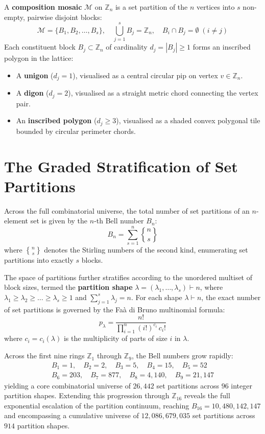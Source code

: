 A \textbf{composition mosaic} $\mathcal{M}$ on $\mathbb{Z}_n$ is a set partition of the $n$ vertices into $s$ non-empty, pairwise disjoint blocks:
\begin{equation}
\mathcal{M} = \{B_1, B_2, \dots, B_s\}, \quad \bigcup_{j=1}^s B_j = \mathbb{Z}_n, \quad B_i \cap B_j = \emptyset \; (i \neq j)
\end{equation}
Each constituent block $B_j \subset \mathbb{Z}_n$ of cardinality $d_j = |B_j| \ge 1$ forms an inscribed polygon in the lattice:
\begin{itemize}
    \item A \textbf{unigon} ($d_j = 1$), visualised as a central circular pip on vertex $v \in \mathbb{Z}_n$.
    \item A \textbf{digon} ($d_j = 2$), visualised as a straight metric chord connecting the vertex pair.
    \item An \textbf{inscribed polygon} ($d_j \ge 3$), visualised as a shaded convex polygonal tile bounded by circular perimeter chords.
\end{itemize}

\section{The Graded Stratification of Set Partitions}

Across the full combinatorial universe, the total number of set partitions of an $n$-element set is given by the $n$-th Bell number $B_n$:
\begin{equation}
B_n = \sum_{s=1}^n \genfrac{\{}{\}}{0pt}{}{n}{s}
\end{equation}
where $\genfrac{\{}{\}}{0pt}{}{n}{s}$ denotes the Stirling numbers of the second kind, enumerating set partitions into exactly $s$ blocks. 

The space of partitions further stratifies according to the unordered multiset of block sizes, termed the \textbf{partition shape} $\lambda = (\lambda_1, \dots, \lambda_s) \vdash n$, where $\lambda_1 \ge \lambda_2 \ge \dots \ge \lambda_s \ge 1$ and $\sum_{j=1}^s \lambda_j = n$. For each shape $\lambda \vdash n$, the exact number of set partitions is governed by the Fa\`a di Bruno multinomial formula:
\begin{equation}
p_\lambda = \frac{n!}{\prod_{i=1}^n (i!)^{c_i} \, c_i!}
\end{equation}
where $c_i = c_i(\lambda)$ is the multiplicity of parts of size $i$ in $\lambda$.

Across the first nine rings $\mathbb{Z}_1$ through $\mathbb{Z}_9$, the Bell numbers grow rapidly:
\begin{gather*}
B_1 = 1, \quad B_2 = 2, \quad B_3 = 5, \quad B_4 = 15, \quad B_5 = 52 \\
B_6 = 203, \quad B_7 = 877, \quad B_8 = 4{,}140, \quad B_9 = 21{,}147
\end{gather*}
yielding a core combinatorial universe of $26{,}442$ set partitions across $96$ integer partition shapes. Extending this progression through $\mathbb{Z}_{16}$ reveals the full exponential escalation of the partition continuum, reaching $B_{16} = 10{,}480{,}142{,}147$ and encompassing a cumulative universe of $12{,}086{,}679{,}035$ set partitions across $914$ partition shapes.

